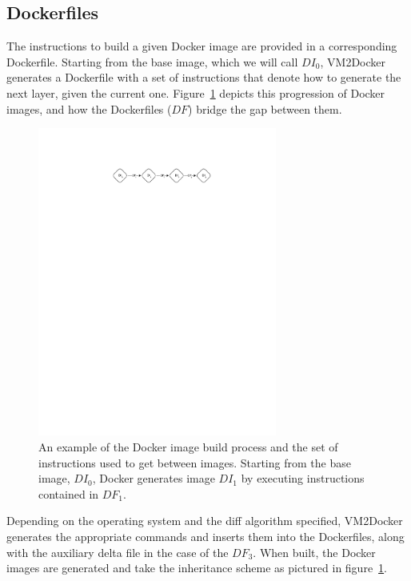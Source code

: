 \subsection{Dockerfiles}
The instructions to build a given Docker image are provided in a corresponding Dockerfile. Starting from the base image, which we will call $DI_0$, VM2Docker generates a Dockerfile with a set of instructions that denote how to generate the next layer, given the current one. Figure~\ref{fig:dockerfiles} depicts this progression of Docker images, and how the Dockerfiles ($DF$) bridge the gap between them.

\begin{figure}[h]

\centering
    \includegraphics[width=0.7\textwidth]{dockerfiles.pdf}
    \caption{An example of the Docker image build process and the set of instructions used to get between images. Starting from the base image, $DI_0$, Docker generates image $DI_1$ by executing instructions contained in $DF_1$.}
\label{fig:dockerfiles}
\end{figure}

Depending on the operating system and the diff algorithm specified, VM2Docker generates the appropriate commands and inserts them into the Dockerfiles, along with the auxiliary delta file in the case of the $DF_3$. When built, the Docker images are generated and take the inheritance scheme as pictured in figure~\ref{fig:dockerfiles}.


